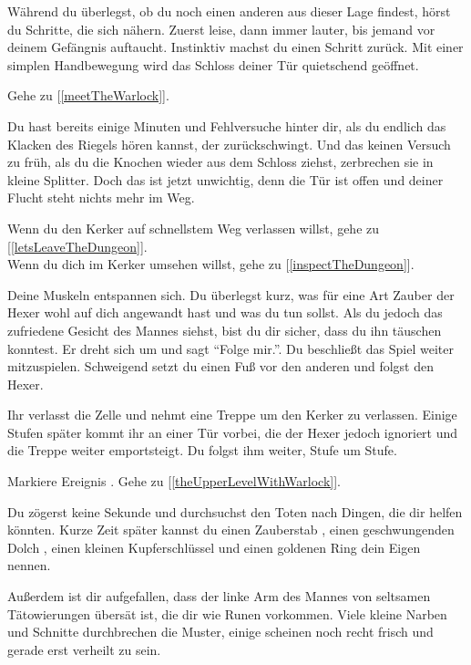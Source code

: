 Während du überlegst, ob du noch einen anderen aus dieser Lage findest, hörst du Schritte, die sich nähern. Zuerst leise, dann immer lauter, bis jemand vor deinem Gefängnis auftaucht. Instinktiv machst du einen Schritt zurück. Mit einer simplen Handbewegung wird das Schloss deiner Tür quietschend geöffnet.

Gehe zu [\ref{meetTheWarlock}].


Du hast bereits einige Minuten und Fehlversuche hinter dir, als du endlich das Klacken des Riegels hören kannst, der zurückschwingt. Und das keinen Versuch zu früh, als du die Knochen wieder aus dem Schloss ziehst, zerbrechen sie in kleine Splitter. Doch das ist jetzt unwichtig, denn die Tür ist offen und deiner Flucht steht nichts mehr im Weg.

Wenn du den Kerker auf schnellstem Weg verlassen willst, gehe zu [\ref{letsLeaveTheDungeon}].
\\Wenn du dich im Kerker umsehen willst, gehe zu [\ref{inspectTheDungeon}].


Deine Muskeln entspannen sich. Du überlegst kurz, was für eine Art Zauber der Hexer wohl auf dich angewandt hast und was du tun sollst. Als du jedoch das zufriedene Gesicht des Mannes siehst, bist du dir sicher, dass du ihn täuschen konntest. Er dreht sich um und sagt ``Folge mir.''. Du beschließt das Spiel weiter mitzuspielen. Schweigend setzt du einen Fuß vor den anderen und folgst den Hexer.

Ihr verlasst die Zelle und nehmt eine Treppe um den Kerker zu verlassen. Einige Stufen später kommt ihr an einer Tür vorbei, die der Hexer jedoch ignoriert und die Treppe weiter emportsteigt. Du folgst ihm weiter, Stufe um Stufe.

Markiere Ereignis . Gehe zu [\ref{theUpperLevelWithWarlock}].


Du zögerst keine Sekunde und durchsuchst den Toten nach Dingen, die dir helfen könnten.
Kurze Zeit später kannst du einen Zauberstab , einen geschwungenden Dolch , einen kleinen Kupferschlüssel  und einen goldenen Ring  dein Eigen nennen.

Außerdem ist dir aufgefallen, dass der linke Arm des Mannes von seltsamen Tätowierungen übersät ist, die dir wie Runen vorkommen. Viele kleine Narben und Schnitte durchbrechen die Muster, einige scheinen noch recht frisch und gerade erst verheilt zu sein.

